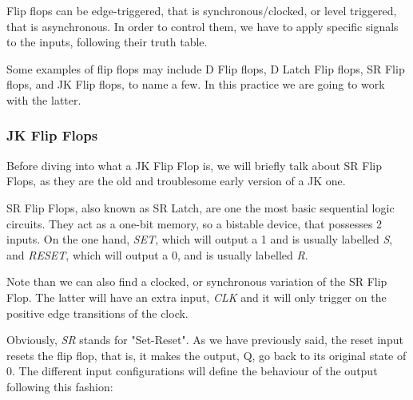 \documentclass[a4paper, 11pt, oneside]{article}
\begin{document}
Flip flops can be edge-triggered, that is synchronous/clocked, or level triggered, that is asynchronous. In order to control them, we have to apply specific signals to the inputs, following their truth table.\medskip

Some examples of flip flops may include D Flip flops, D Latch Flip flops, SR Flip flops, and JK Flip flops, to name a few. In this practice we are going to work with the latter.

\subsubsection{JK Flip Flops}

Before diving into what a JK Flip Flop is, we will briefly talk about SR Flip Flops, as they are the old and troublesome early version of a JK one.\medskip

SR Flip Flops, also known as SR Latch, are one the most basic sequential logic circuits. They act as a one-bit memory, so a bistable device, that possesses 2 inputs. On the one hand, \textit{SET}, which will output a 1 and is usually labelled \textit{S}, and \textit{RESET}, which will output a 0, and is usually labelled \textit{R}. \medskip

Note than we can also find a clocked, or synchronous variation of the SR Flip Flop. The latter will have an extra input, \textit{CLK} and it will only trigger on the positive edge transitions of the clock.\medskip

Obviously, \textit{SR} stands for "Set-Reset". As we have previously said, the reset input resets the flip flop, that is, it makes the output, Q, go back to its original state of 0. The different input configurations will define the behaviour of the output following this fashion:\medskip
\end{document}
